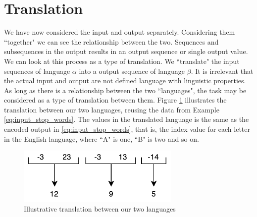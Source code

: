 
\section{Translation}
We have now considered the input and output separately. Considering them ``together" we can see the relationship between the two. Sequences and subsequences in the output results in an output sequence or single output value. We can look at this process as a type of translation. We ``translate" the input sequences of language \(\alpha\) into a output sequence of language \(\beta\). It is irrelevant that the actual input and output are not defined language with linguistic properties. As long as there is a relationship between the two ``languages", the task may be considered as a type of translation between them. Figure \ref{fig:number_translation} illustrates the translation between our two languages, reusing the data from Example \ref{eq:input_stop_words}. The values in the translated language is the same as the encoded output in \ref{eq:input_stop_words}, that is, the index value for each letter in the English language, where ``A" is one, ``B" is two and so on.

\begin{figure}[h]
    \centering
    \includegraphics[width=0.7\textwidth]{fig/background_theory/number_translation.pdf}
    \caption{Illustrative translation between our two languages}
    \label{fig:number_translation}
\end{figure}

